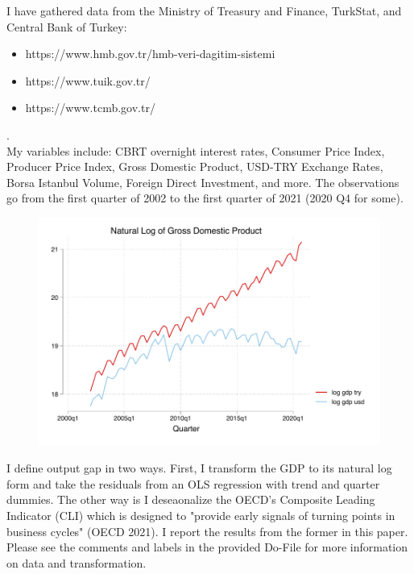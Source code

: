 \documentclass{article}
\begin{document}
    I have gathered data from the Ministry of Treasury and Finance, TurkStat, and Central Bank of Turkey:
    \begin{itemize}
        \item https://www.hmb.gov.tr/hmb-veri-dagitim-sistemi
        \item https://www.tuik.gov.tr/
        \item https://www.tcmb.gov.tr/
    \end{itemize}
    {\tiny .}\\
    My variables include: CBRT overnight interest rates, Consumer Price Index, Producer Price Index, Gross Domestic Product, USD-TRY Exchange Rates, Borsa Istanbul Volume, Foreign Direct Investment, and more. The observations go from the first quarter of 2002 to the first quarter of 2021 (2020 Q4 for some).
    \begin{figure}[H]
        \centering
        \includegraphics[width=\linewidth-1cm]{turkey_taylor/gdp.pdf}
    \end{figure}
    I define output gap in two ways. First, I transform the GDP to its natural log form and take the residuals from an OLS regression with trend and quarter dummies. The other way is I deseaonalize the OECD's Composite Leading Indicator (CLI) which is designed to "provide early signals of turning points in business cycles" (OECD 2021). I report the results from the former in this paper. Please see the comments and labels in the provided Do-File for more information on data and transformation.
\end{document}
